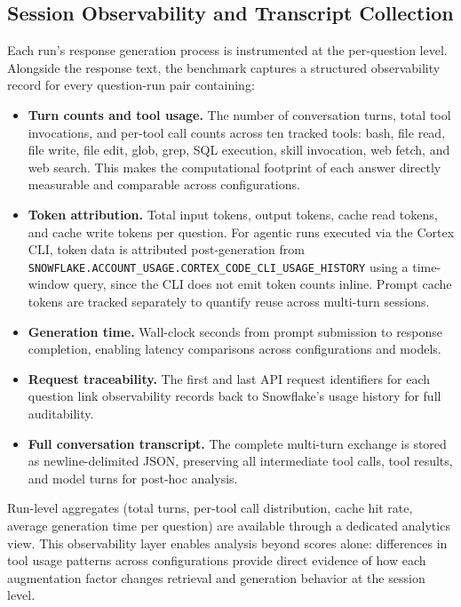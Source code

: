 \documentclass[10pt,letterpaper]{article}
\begin{document}
\subsection{Session Observability and Transcript Collection}

Each run's response generation process is instrumented at the per-question level. Alongside the response text, the benchmark captures a structured observability record for every question-run pair containing:

\begin{itemize}[nosep]
  \item \textbf{Turn counts and tool usage.} The number of conversation turns, total tool invocations, and per-tool call counts across ten tracked tools: bash, file read, file write, file edit, glob, grep, SQL execution, skill invocation, web fetch, and web search. This makes the computational footprint of each answer directly measurable and comparable across configurations.
  \item \textbf{Token attribution.} Total input tokens, output tokens, cache read tokens, and cache write tokens per question. For agentic runs executed via the Cortex CLI, token data is attributed post-generation from \texttt{SNOWFLAKE.ACCOUNT\_USAGE.CORTEX\_CODE\_CLI\_USAGE\_HISTORY} using a time-window query, since the CLI does not emit token counts inline. Prompt cache tokens are tracked separately to quantify reuse across multi-turn sessions.
  \item \textbf{Generation time.} Wall-clock seconds from prompt submission to response completion, enabling latency comparisons across configurations and models.
  \item \textbf{Request traceability.} The first and last API request identifiers for each question link observability records back to Snowflake's usage history for full auditability.
  \item \textbf{Full conversation transcript.} The complete multi-turn exchange is stored as newline-delimited JSON, preserving all intermediate tool calls, tool results, and model turns for post-hoc analysis.
\end{itemize}

Run-level aggregates (total turns, per-tool call distribution, cache hit rate, average generation time per question) are available through a dedicated analytics view. This observability layer enables analysis beyond scores alone: differences in tool usage patterns across configurations provide direct evidence of how each augmentation factor changes retrieval and generation behavior at the session level.
\end{document}
